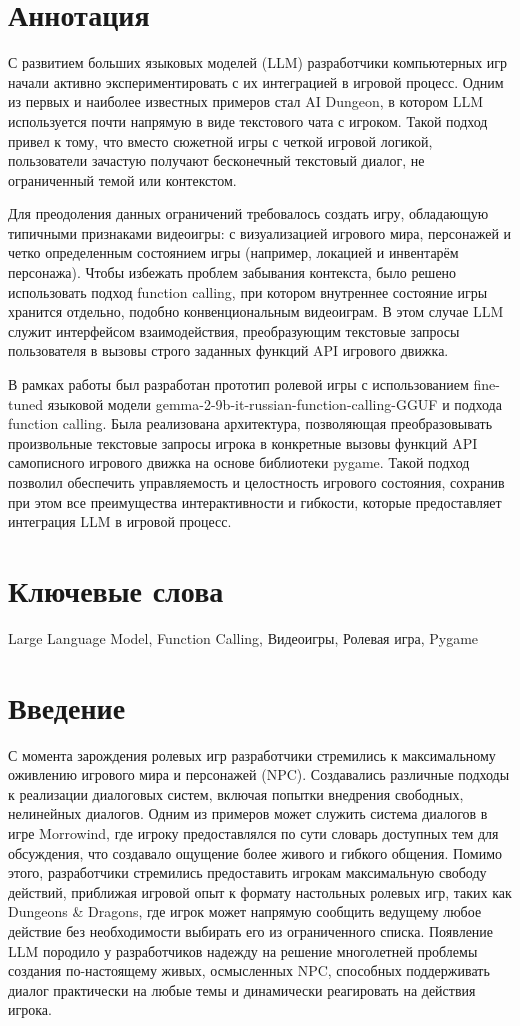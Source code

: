 \documentclass[14pt]{extarticle}
\begin{document}
\section*{Аннотация}
С развитием больших языковых моделей (LLM) разработчики компьютерных игр начали активно экспериментировать с их интеграцией в игровой процесс. Одним из первых и наиболее известных примеров стал AI Dungeon, в котором LLM используется почти напрямую в виде текстового чата с игроком. Такой подход привел к тому, что вместо сюжетной игры с четкой игровой логикой, пользователи зачастую получают бесконечный текстовый диалог, не ограниченный темой или контекстом.

Для преодоления данных ограничений требовалось создать игру, обладающую типичными признаками видеоигры: с визуализацией игрового мира, персонажей и четко определенным состоянием игры (например, локацией и инвентарём персонажа). Чтобы избежать проблем забывания контекста, было решено использовать подход function calling, при котором внутреннее состояние игры хранится отдельно, подобно конвенциональным видеоиграм. В этом случае LLM служит интерфейсом взаимодействия, преобразующим текстовые запросы пользователя в вызовы строго заданных функций API игрового движка.

В рамках работы был разработан прототип ролевой игры с использованием fine-tuned языковой модели gemma-2-9b-it-russian-function-calling-GGUF и подхода function calling. Была реализована архитектура, позволяющая преобразовывать произвольные текстовые запросы игрока в конкретные вызовы функций API самописного игрового движка на основе библиотеки pygame. Такой подход позволил обеспечить управляемость и целостность игрового состояния, сохранив при этом все преимущества интерактивности и гибкости, которые предоставляет интеграция LLM в игровой процесс.
\section*{Ключевые слова}
Large Language Model, Function Calling, Видеоигры, Ролевая игра, Pygame
\newpage
\section{Введение}
С момента зарождения ролевых игр разработчики стремились к максимальному оживлению игрового мира и персонажей (NPC). Создавались различные подходы к реализации диалоговых систем, включая попытки внедрения свободных, нелинейных диалогов. Одним из примеров может служить система диалогов в игре Morrowind, где игроку предоставлялся по сути словарь доступных тем для обсуждения, что создавало ощущение более живого и гибкого общения. Помимо этого, разработчики стремились предоставить игрокам максимальную свободу действий, приближая игровой опыт к формату настольных ролевых игр, таких как Dungeons \& Dragons\cite{dandd}, где игрок может напрямую сообщить ведущему любое действие без необходимости выбирать его из ограниченного списка. Появление LLM породило у разработчиков надежду на решение многолетней проблемы создания по-настоящему живых, осмысленных NPC, способных поддерживать диалог практически на любые темы и динамически реагировать на действия игрока.
\end{document}
